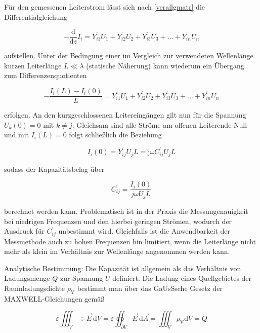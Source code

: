 Für den gemessenen Leiterstrom lässt sich nach \ref{verallgmatr} die Differentialgleichung


\begin{equation}
	-\frac{\mathrm{d}}{\mathrm{d} z} I_{i}=Y_{i 1}^{\prime} U_{1}+Y_{i 2}^{\prime} U_{2}+Y_{i 3}^{\prime} U_{3}+\ldots+Y_{i n}^{\prime} U_{n} 
\end{equation}


aufstellen. Unter der Bedingung einer im Vergleich zur verwendeten Wellenlänge kurzen Leiterlänge $L \ll \lambda$ (statische Näherung) kann wiederum ein Übergang zum Differenzenquotienten


\begin{equation}
	-\frac{I_{i}(L)-I_{i}(0)}{L}=Y_{i 1}^{\prime} U_{1}+Y_{i 2}^{\prime} U_{2}+Y_{i 3}^{\prime} U_{3}+\ldots+Y_{i n}^{\prime} U_{n} 
\end{equation}


erfolgen. An den kurzgeschlossenen Leitereingängen gilt nun für die Spannung $U_{k}(0)=0$ mit $k \neq j$. Gleichsam sind alle Ströme am offenen Leiterende Null und mit $I_{i}(L)=0$ folgt schließlich die Beziehung


\begin{equation}
	I_{i}(0)=Y_{i j}^{\prime} U_{j} L=\mathrm{j} \omega C_{i j}^{\prime} U_{j} L 
\end{equation}


sodass der Kapazitätsbelag über


\begin{equation}
	C_{i j}^{\prime}=\frac{I_{i}(0)}{j \omega U_{j} L} 
\end{equation}


berechnet werden kann. Problematisch ist in der Praxis die Messungenauigkeit bei niedrigen Frequenzen und den hierbei geringen Strömen, wodurch der Ausdruck für $C_{i j}^{\prime}$ unbestimmt wird. Gleichfalls ist die Anwendbarkeit der Messmethode auch zu hohen Frequenzen hin limitiert, wenn die Leiterlänge nicht mehr als klein im Verhältnis zur Wellenlänge angenommen werden kann.

Analytische Bestimmung: Die Kapazität ist allgemein als das Verhältnis von Ladungsmenge $Q$ zur Spannung $U$ definiert. Die Ladung eines Quellgebietes der Raumladungsdichte $\rho_{\mathrm{V}}$ bestimmt man über das GaUsSsche Gesetz der MAXWELL-Gleichungen gemäß


\begin{equation}
	\varepsilon \iiint_{V} \div \vec{E} \mathrm{~d} V=\varepsilon \oiint_{\partial V} \vec{E} \mathrm{~d} \vec{A}=\iiint_{V} \rho_{\mathrm{V}} \mathrm{d} V=Q 
\end{equation}


